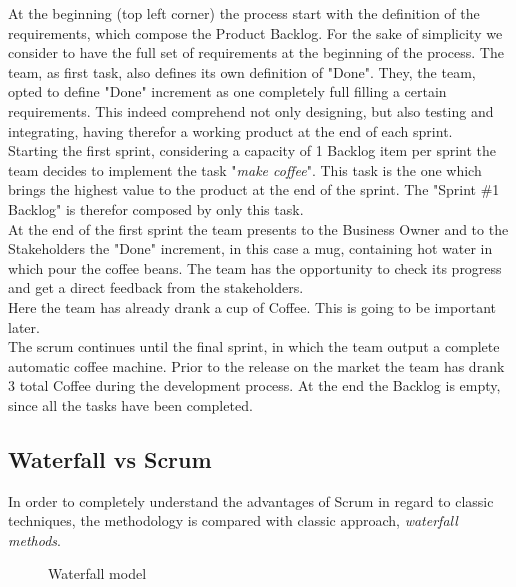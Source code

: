 \documentclass[../main.tex]{subfiles}
\newcommand\connectow[2]%
  {\draw[thick, ->] (#1) |- (#2);
  }
\begin{document}
At the beginning (top left corner) the process start with the definition of the requirements, which compose the Product Backlog. For the sake of simplicity we consider to have the full set of requirements at the beginning of the process. The team, as first task, also defines its own definition of "Done". They,  the team, opted to define "Done" increment as one completely full filling a certain requirements. This indeed comprehend not only designing, but also testing and integrating, having therefor a working product at the end of each sprint.\\
Starting the first sprint, considering a capacity of 1 Backlog item per sprint the team decides to implement the task "\textit{make coffee}". This task is the one which brings the highest value to the product at the end of the sprint. The "Sprint \#1 Backlog" is therefor composed by only this task.\\
At the end of the first sprint the team presents to the Business Owner and to the Stakeholders the "Done" increment, in this case a mug, containing hot water in which pour the coffee beans. The team has the opportunity to check its progress and get a direct feedback from the stakeholders.\\ Here the team has already drank a cup of Coffee. This is going to be important later.\\ The scrum continues until the final sprint, in which the team output a complete automatic coffee machine. Prior to the release on the market the team has drank 3 total Coffee during the development process. At the end the Backlog is empty, since all the tasks have been completed. 
\subsection{Waterfall vs Scrum}
In order to completely understand the advantages of Scrum in regard to classic techniques, the methodology is compared with classic approach, \textit{waterfall methods}.
\begin{figure}[H]
\centering
\caption{Waterfall model}
\end{figure}
\end{document}
